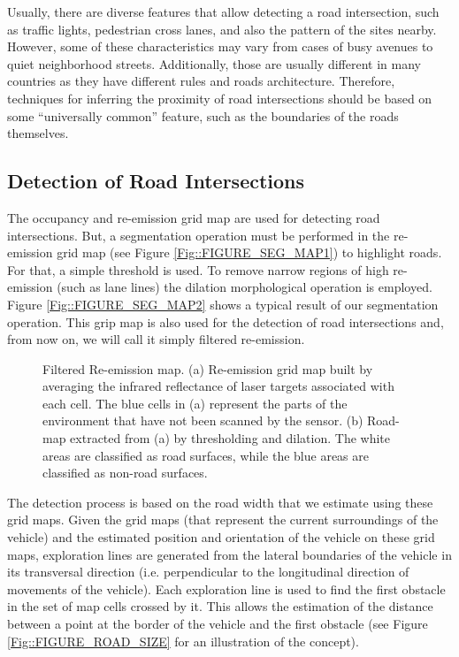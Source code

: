 Usually, there are diverse features that allow detecting a road intersection, such as traffic lights, pedestrian cross lanes, and also the pattern of the sites nearby. However, some of these characteristics may vary from cases of busy avenues to quiet neighborhood streets. Additionally, those are usually different in many countries as they have different rules and roads architecture. Therefore, techniques for inferring the proximity of road intersections should be based on some ``universally common'' feature, such as the boundaries of the roads themselves.

\subsection{Detection of Road Intersections}

The occupancy and re-emission grid map are used for detecting road intersections. But, a segmentation operation must be performed in the re-emission grid map (see Figure \ref{Fig::FIGURE_SEG_MAP1}) to highlight roads. For that, a simple threshold is used. To remove narrow regions of high re-emission (such as lane lines) the dilation morphological operation is employed. Figure \ref{Fig::FIGURE_SEG_MAP2} shows a typical result of our segmentation operation. This grip map is also used for the detection of road intersections and, from now on, we will call it simply filtered re-emission. 

\begin{figure}[t]
	\centering
	\caption{Filtered Re-emission map. (a) Re-emission grid map built by averaging the infrared reflectance of laser targets associated with each cell. The blue cells in (a) represent the parts of the environment that have not been scanned by the sensor. (b) Road-map extracted from (a) by thresholding and dilation. The white areas are classified as road surfaces, while the blue areas are classified as non-road surfaces.}
	\label{Fig::FIGURE_SEG_MAP}
\end{figure}

The detection process is based on the road width that we estimate using these grid maps. Given the grid maps (that represent the current surroundings of the vehicle) and the estimated position and orientation of the vehicle on these grid maps, exploration lines are generated from the lateral boundaries of the vehicle in its transversal direction (i.e. perpendicular to the longitudinal direction of movements of the vehicle). Each exploration line is used to find the first obstacle in the set of map cells crossed by it. This allows the estimation of the distance between a point at the border of the vehicle and the first obstacle (see Figure \ref{Fig::FIGURE_ROAD_SIZE} for an illustration of the concept).

